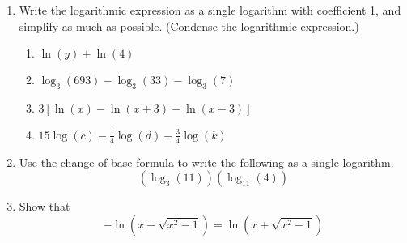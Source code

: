 \documentclass[11pt]{article}
\begin{document}
\begin{enumerate}
\newpage

\item Write the logarithmic expression as a single logarithm with coefficient 1, and simplify as much as possible.  (Condense the logarithmic expression.)


\begin{enumerate}
\item $\ln(y)+\ln(4)$\vfill
\item $\log_3(693)-\log_3(33)-\log_3(7)$\vfill
\item $3[\ln(x)-\ln(x+3)-\ln(x-3)]$\vfill
\item $\displaystyle 15\log(c)-\frac{1}{4}\log(d)-\frac{3}{4}\log(k)$\vfill
\end{enumerate}




\newpage

\item Use the change-of-base formula to write the following as a single logarithm. $$(\log_3(11))(\log_{11}(4))$$ 


\vfill
\item  Show that $$-\ln(x-\sqrt{x^2-1})=\ln(x+\sqrt{x^2-1})$$

  
\vfill

\end{enumerate}
\end{document}

